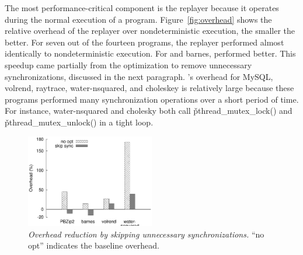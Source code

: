 
The most performance-critical component is the replayer because it
operates during the normal execution of a program.
Figure~\ref{fig:overhead} shows the relative overhead of the replayer over
nondeterministic execution, the smaller the better.  For seven out of
the fourteen programs, the replayer performed almost identically to
nondeterministic execution. For \pbzip and barnes, \tern performed
better.  This speedup came partially from the optimization to remove
unnecessary synchronizations, discussed in the next paragraph.  \tern's overhead
for MySQL, volrend, raytrace, water-nsquared, and choleskey is relatively
large because these programs performed many synchronization operations
over a short period of time.  For instance, water-nsquared and cholesky
both call \v{pthread\_mutex\_lock()} and \v{pthread\_mutex\_unlock()} in a
tight loop.



\begin{figure}[t]
\centering
\includegraphics[width=0.5\textwidth]{tern/figures/opt-overhead}
\caption{\small {\em Overhead reduction by skipping unnecessary
    synchronizations.} ``no opt'' indicates the baseline overhead.}
\label{fig:opt-remove-sync}
\end{figure}

